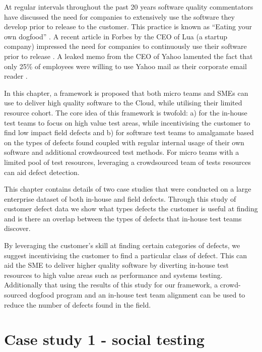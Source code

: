 At regular intervals throughout the past 20 years software quality commentators have discussed the need for companies to extensively use the software they develop prior to release to the customer. This practice is known as ``Eating your own dogfood'' \cite{wikidogfood}. A recent article in Forbes by the CEO of Lua (a startup company) impressed the need for companies to continuously use their software prior to release \cite{forbesdogfood}. A leaked memo from the CEO of Yahoo lamented the fact that only 25\% of employees were willing to use Yahoo mail as their corporate email reader \cite{forbesyahoodogfood}. \par

In this chapter, a framework is proposed that both micro teams and SMEs can use to deliver high quality software to the Cloud, while utilising their limited resource cohort. The core idea of this framework is twofold: a) for the in-house test teams to focus on high value test areas, while incentivising the customer to find low impact field defects and b) for software test teams to amalgamate based on the types of defects found coupled with regular internal usage of their own software and additional crowdsourced test methods. For micro teams with a limited pool of test resources, leveraging a crowdsourced team of tests resources can aid defect detection.

This chapter contains details of two case studies that were conducted on a large enterprise dataset of both in-house and field defects. Through this study of customer defect data we show what types defects the customer is useful at finding and is there an overlap between the types of defects that in-house test teams discover.

By leveraging the customer's skill at finding certain categories of defects, we suggest incentivising the customer to find a particular class of defect. This can aid the SME to deliver higher quality software by diverting in-house test resources to high value areas such as performance and systems testing. Additionally that using the results of this study for our framework, a crowd-sourced dogfood program and an in-house test team alignment can be used to reduce the number of defects found in the field. 

\section{Case study 1 - social testing}

